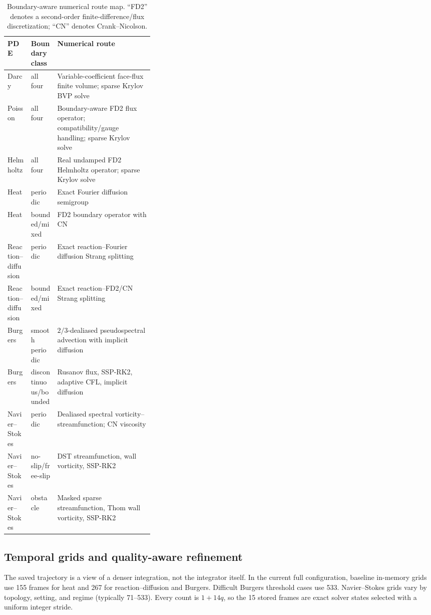 \documentclass[10pt]{article}
\begin{document}
\begin{table}[H]
\centering
\caption{Boundary-aware numerical route map.  ``FD2'' denotes a second-order
finite-difference/flux discretization; ``CN'' denotes Crank--Nicolson.}
\label{tab:solver-map}
\small
\begin{tabularx}{\linewidth}{@{}p{0.16\linewidth}p{0.18\linewidth}Y@{}}
\toprule
PDE & Boundary class & Numerical route \\
\midrule
Darcy & all four & Variable-coefficient face-flux finite volume; sparse Krylov BVP solve \\
Poisson & all four & Boundary-aware FD2 flux operator; compatibility/gauge handling; sparse Krylov solve \\
Helmholtz & all four & Real undamped FD2 Helmholtz operator; sparse Krylov solve \\
Heat & periodic & Exact Fourier diffusion semigroup \\
Heat & bounded/mixed & FD2 boundary operator with CN \\
Reaction--diffusion & periodic & Exact reaction--Fourier diffusion Strang splitting \\
Reaction--diffusion & bounded/mixed & Exact reaction--FD2/CN Strang splitting \\
Burgers & smooth periodic & $2/3$-dealiased pseudospectral advection with implicit diffusion \\
Burgers & discontinuous/\newline bounded & Rusanov flux, SSP-RK2, adaptive CFL, implicit diffusion \\
Navier--Stokes & periodic & Dealiased spectral vorticity--streamfunction; CN viscosity \\
Navier--Stokes & no-slip/free-slip & DST streamfunction, wall vorticity, SSP-RK2 \\
Navier--Stokes & obstacle & Masked sparse streamfunction, Thom wall vorticity, SSP-RK2 \\
\bottomrule
\end{tabularx}
\end{table}

\subsection{Temporal grids and quality-aware refinement}

The saved trajectory is a view of a denser integration, not the integrator
itself.  In the current full configuration, baseline in-memory grids use 155
frames for heat and 267 for reaction--diffusion and Burgers.  Difficult
Burgers threshold cases use 533.  Navier--Stokes grids vary by topology,
setting, and regime (typically 71--533).  Every count is $1+14q$, so the 15
stored frames are exact solver states selected with a uniform integer stride.
\end{document}
